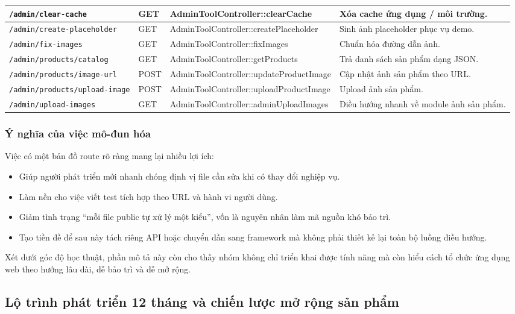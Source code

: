 \documentclass[11pt, a4paper]{article}
\begin{document}
\begin{longtable}{|p{3.0cm}|p{1.8cm}|p{4.0cm}|p{3.8cm}|}
    \texttt{/admin/clear-cache} & GET & AdminToolController::clearCache & Xóa cache ứng dụng / môi trường. \\ \hline
    \texttt{/admin/create-placeholder} & GET & AdminToolController::createPlaceholder & Sinh ảnh placeholder phục vụ demo. \\ \hline
    \texttt{/admin/fix-images} & GET & AdminToolController::fixImages & Chuẩn hóa đường dẫn ảnh. \\ \hline
    \texttt{/admin/products/catalog} & GET & AdminToolController::getProducts & Trả danh sách sản phẩm dạng JSON. \\ \hline
    \texttt{/admin/products/image-url} & POST & AdminToolController::updateProductImage & Cập nhật ảnh sản phẩm theo URL. \\ \hline
    \texttt{/admin/products/upload-image} & POST & AdminToolController::uploadProductImage & Upload ảnh sản phẩm. \\ \hline
    \texttt{/admin/upload-images} & GET & AdminToolController::adminUploadImages & Điều hướng nhanh về module ảnh sản phẩm. \\ \hline
\end{longtable}
\endgroup

\subsubsection{Ý nghĩa của việc mô-đun hóa}

Việc có một bản đồ route rõ ràng mang lại nhiều lợi ích:

\begin{itemize}[leftmargin=*]
    \item Giúp người phát triển mới nhanh chóng định vị file cần sửa khi có thay đổi nghiệp vụ.
    \item Làm nền cho việc viết test tích hợp theo URL và hành vi người dùng.
    \item Giảm tình trạng ``mỗi file public tự xử lý một kiểu'', vốn là nguyên nhân làm mã nguồn khó bảo trì.
    \item Tạo tiền đề để sau này tách riêng API hoặc chuyển dần sang framework mà không phải thiết kế lại toàn bộ luồng điều hướng.
\end{itemize}

Xét dưới góc độ học thuật, phần mô tả này còn cho thấy nhóm không chỉ triển khai
được tính năng mà còn hiểu cách tổ chức ứng dụng web theo hướng lâu dài, dễ bảo trì
và dễ mở rộng.

\clearpage
\subsection{Lộ trình phát triển 12 tháng và chiến lược mở rộng sản phẩm}
\end{document}
